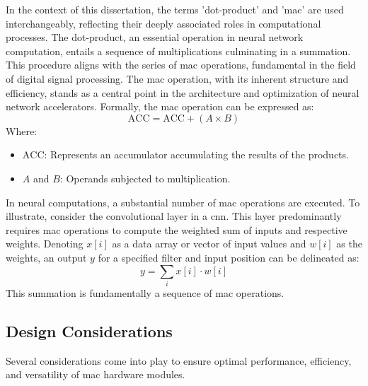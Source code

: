 In the context of this dissertation, the terms 'dot-product' and '\gls{mac}' are used interchangeably, reflecting their deeply associated roles in computational processes. The dot-product, an essential operation in neural network computation, entails a sequence of multiplications culminating in a summation. This procedure aligns with the series of \gls{mac} operations, fundamental in the field of digital signal processing. The \gls{mac} operation, with its inherent structure and efficiency, stands as a central point in the architecture and optimization of neural network accelerators. Formally, the \gls{mac} operation can be expressed as:
\begin{equation}
\text{ACC} = \text{ACC} + (A \times B)
\end{equation}
Where:
\begin{itemize}
	\item \( \text{ACC} \): Represents an accumulator accumulating the results of the products.
	\item \( A \) and \( B \): Operands subjected to multiplication.
\end{itemize}

In neural computations, a substantial number of \gls{mac} operations are executed. To illustrate, consider the convolutional layer in a \gls{cnn}. This layer predominantly requires \gls{mac} operations to compute the weighted sum of inputs and respective weights. Denoting \( x[i] \) as a data array or vector of input values and \( w[i] \) as the weights, an output \( y \) for a specified filter and input position can be delineated as:
\begin{equation}
y = \sum_{i} x[i] \cdot w[i]
\end{equation}
This summation is fundamentally a sequence of \gls{mac} operations.

\subsection{Design Considerations}
Several considerations come into play to ensure optimal performance, efficiency, and versatility of \gls{mac} hardware modules.

